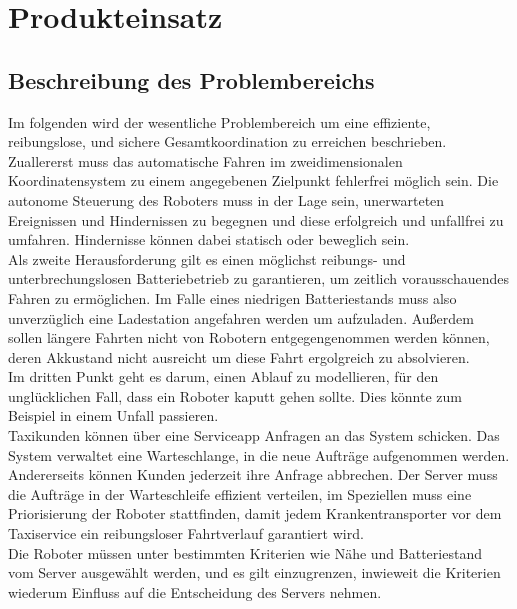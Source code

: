 
	\section{Produkteinsatz}
	
	\subsection{Beschreibung des Problembereichs}
	Im folgenden wird der wesentliche Problembereich um eine effiziente, reibungslose, und sichere Gesamtkoordination zu erreichen beschrieben.\\

Zuallererst muss das automatische Fahren im zweidimensionalen Koordinatensystem zu einem angegebenen Zielpunkt fehlerfrei möglich sein. 
	Die autonome Steuerung des Roboters muss in der Lage sein, unerwarteten Ereignissen und Hindernissen zu begegnen und diese erfolgreich und unfallfrei zu umfahren. Hindernisse können dabei statisch oder beweglich sein.\\
	
Als zweite Herausforderung gilt es einen möglichst reibungs- und unterbrechungslosen Batteriebetrieb zu garantieren, um zeitlich vorausschauendes Fahren zu ermöglichen. Im Falle eines niedrigen Batteriestands muss also unverzüglich eine Ladestation angefahren werden um aufzuladen. Außerdem sollen längere Fahrten nicht von Robotern entgegengenommen werden können, deren Akkustand nicht ausreicht um diese Fahrt ergolgreich zu absolvieren.\\

Im dritten Punkt geht es darum, einen Ablauf zu modellieren, für den unglücklichen Fall, dass ein Roboter kaputt gehen sollte. Dies könnte zum Beispiel in einem Unfall passieren.\\

Taxikunden können über eine Serviceapp Anfragen an das System schicken. Das System verwaltet eine Warteschlange, in die neue Aufträge aufgenommen werden. Andererseits können Kunden jederzeit ihre Anfrage abbrechen. Der Server muss die Aufträge in der Warteschleife effizient verteilen, im Speziellen muss eine Priorisierung der Roboter stattfinden, damit jedem Krankentransporter vor dem Taxiservice ein reibungsloser Fahrtverlauf garantiert wird.\\

Die Roboter müssen unter bestimmten Kriterien wie Nähe und Batteriestand vom Server ausgewählt werden, und es gilt einzugrenzen, inwieweit die Kriterien wiederum Einfluss auf die Entscheidung des Servers nehmen.\\

